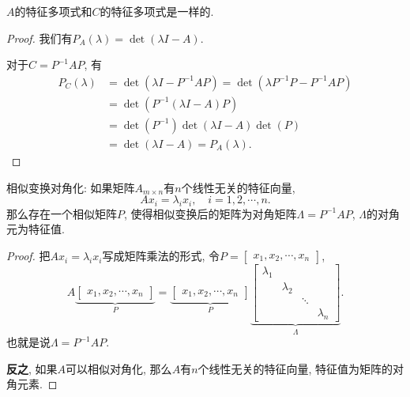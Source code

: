 \begin{proposition}
    $A$的特征多项式和$C$的特征多项式是一样的.
\end{proposition}
\begin{proof}
    我们有$P_{A}\left( \lambda \right) = \det \left( \lambda I - A \right) $.

    对于$C = P ^{-1} A P$, 有
    \begin{equation} 
      \begin{aligned}
        P_{C} \left( \lambda \right) 
        & = \det \left( \lambda I - P ^{-1} A P \right) = \det \left( \lambda P ^{-1} P - P ^{-1} A P \right)
        \\
        & = \det \left( P ^{-1} \left( \lambda I - A \right) P \right) 
        \\
        & = \det \left( P ^{-1} \right) \det \left( \lambda I - A \right) \det \left( P \right) 
        \\
        & = \det \left( \lambda I -A \right)  = P_{A} \left( \lambda \right).
      \end{aligned}
    \end{equation}
\end{proof}

相似变换对角化: 
如果矩阵$A_{m \times n}$有$n$个线性无关的特征向量,
\begin{equation}
  A x_i = \lambda_i x_i, \quad i = 1, 2, \cdots, n.
\end{equation}
那么存在一个相似矩阵$P$, 使得相似变换后的矩阵为对角矩阵$\Lambda = P ^{-1}AP$, $\Lambda$的对角元为特征值.

\begin{proof}
    把$A x_i = \lambda_i x_i$写成矩阵乘法的形式, 令$P = \begin{bmatrix} x_1, x_2, \cdots, x_n \end{bmatrix}$,
    \begin{equation}
      A \underbrace{\begin{bmatrix} x_1, x_2, \cdots, x_n \end{bmatrix}}_{P} = \underbrace{\begin{bmatrix} x_1, x_2, \cdots, x_n \end{bmatrix}}_{P} \underbrace{\begin{bmatrix} \lambda_1 & & & \\ & \lambda_2 & & \\ & & \ddots & \\ & & & \lambda_n \end{bmatrix}}_{\Lambda}.
    \end{equation}
    也就是说$\Lambda = P ^{-1} A P$.

    \textbf{反之}, 如果$A$可以相似对角化, 那么$A$有$n$个线性无关的特征向量, 特征值为矩阵的对角元素.
\end{proof}

